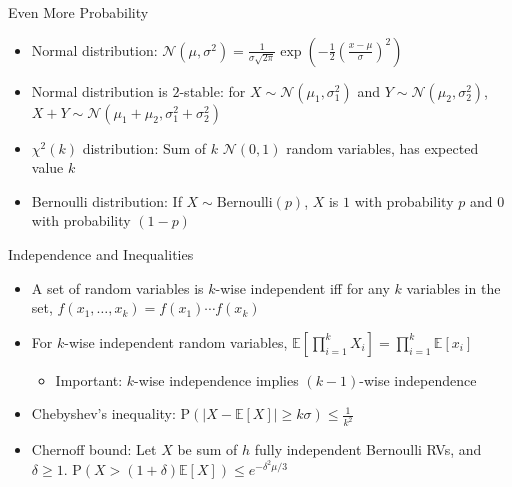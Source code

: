 \documentclass[aspectratio=169]{beamer}
\begin{document}
\begin{frame}{Even More Probability}
\protect\hypertarget{even-more-probability}{}
\begin{itemize}
    \item Normal distribution:
\(\mathcal{N}(\mu, \sigma^2) = \frac{1}{\sigma \sqrt{2\pi}}\exp\left(-\frac{1}{2}\left(\frac{x-\mu}{\sigma}\right)^2\right)\) \pause

    \item Normal distribution is \(2\)-stable: for
\(X \sim \mathcal{N}(\mu_1, \sigma^2_1)\) and
\(Y \sim \mathcal{N}(\mu_2, \sigma^2_2)\),
\(X + Y \sim \mathcal{N}(\mu_1+\mu_2, \sigma^2_1 + \sigma_2^2)\) \pause

    \item \(\chi^2(k)\) distribution: Sum of \(k\) \(\mathcal{N}(0,1)\) random
variables, has expected value \(k\) \pause
    \item Bernoulli distribution: If \(X \sim \text{Bernoulli}(p)\), \(X\) is
\(1\) with probability \(p\) and \(0\) with probability $(1-p)$

\end{itemize}

\end{frame}

\begin{frame}{Independence and Inequalities}
\protect\hypertarget{independence-and-inequalities}{}
\begin{itemize}
    \item A set of random variables is \(k\)-wise independent iff for any \(k\)
variables in the set, \(f(x_1,\dots,x_k)=f(x_1)\cdots f(x_k)\) \pause
    \item For \(k\)-wise independent random variables,
\(\mathbb{E}\left[\prod_{i=1}^k X_i\right] = \prod_{i=1}^k \mathbb{E}[x_i]\) \pause
    \begin{itemize}
        \item Important: \(k\)-wise independence implies \((k-1)\)-wise independence \pause
    \end{itemize}
    \item Chebyshev's inequality:
\(\text{P}(|X - \mathbb{E}[X]| \geq k\sigma) \leq \frac{1}{k^2}\) \pause
    \item Chernoff bound: Let \(X\) be sum of \(h\) fully independent Bernoulli
RVs, and \(\delta \geq 1\).
\(\text{P}(X > (1+\delta)\mathbb{E}[X]) \leq e^{-\delta^2 \mu / 3}\)
\end{itemize}
\end{frame}
\end{document}
